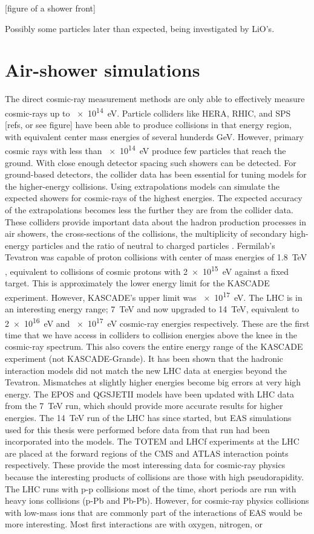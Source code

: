 [figure of a shower front]

Possibly some particles later than expected, being investigated by LiO's.


\section{Air-shower simulations}

The direct cosmic-ray measurement methods are only able to effectively measure cosmic-rays up to \SI{e14}{\eV}. Particle colliders like HERA, RHIC, and SPS [refs, or see figure] have been able to produce collisions in that energy region, with equivalent center mass energies of several hunderds \si{\GeV}. However, primary cosmic rays with less than \SI{e14}{\eV} produce few particles that reach the ground. With close enough detector spacing such showers can be detected. For ground-based detectors, the collider data has been essential for tuning models for the higher-energy collisions. Using extrapolations models can simulate the expected showers for cosmic-rays of the highest energies. The expected accuracy of the extrapolations becomes less the further they are from the collider data. These colliders provide important data about the hadron production processes in air showers, the cross-sections of the collisions, the multiplicity of secondary high-energy particles and the ratio of neutral to charged particles \cite{pierog2008lhc}. Fermilab's Tevatron was capable of proton collisions with center of mass energies of \SI{1.8}{\TeV} \cite{abe1994tevatron}, equivalent to collisions of cosmic protons with \SI{2e15}{\eV} against a fixed target. This is approximately the lower energy limit for the KASCADE experiment. However, KASCADE's upper limit was \SI{e17}{\eV}. The LHC is in an interesting energy range; \SI{7}{\TeV} and now upgraded to \SI{14}{\TeV}, equivalent to \SI{2e16}{\eV} and \SI{e17}{\eV} cosmic-ray energies respectively. These are the first time that we have access in colliders to collision energies above the knee in the cosmic-ray spectrum. This also covers the entire energy range of the KASCADE experiment (not KASCADE-Grande). It has been shown that the hadronic interaction models did not match the new LHC data at energies beyond the Tevatron. Mismatches at slightly higher energies become big errors at very high energy. The EPOS and QGSJETII models have been updated with LHC data from the \SI{7}{\TeV} run, which should provide more accurate results for higher energies. The \SI{14}{\TeV} run of the LHC has since started, but EAS simulations used for this thesis were performed before data from that run had been incorporated into the models. The TOTEM and LHCf experiments at the LHC are placed at the forward regions of the CMS and ATLAS interaction points respectively. These provide the most interessing data for cosmic-ray physics because the interesting products of collisions are those with high pseudorapidity. The LHC runs with p-p collisions most of the time, short periods are run with heavy ions collisions (p-Pb and Pb-Pb). However, for cosmic-ray physics collisions with low-mass ions that are commonly part of the interactions of EAS would be more interesting. Most first interactions are with oxygen, nitrogen, or 